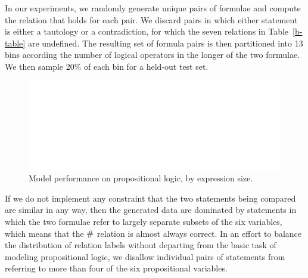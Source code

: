 In our experiments, we randomly generate unique pairs 
of formulae and compute the relation that holds for each pair.
We discard pairs in which either statement is either a tautology or a
contradiction, for which the seven relations in
Table~\ref{b-table} are undefined. The resulting set of formula pairs is
then partitioned into 13 bins according the number of logical operators in
the longer of the two formulae. We then sample 20\% of each
bin for a held-out test set.

\begin{figure}[t]
  \centering
  \includegraphics[width=5.75in]{decayfig.eps}
  \caption{Model performance on propositional logic, by expression size.}
    
  \label{prop-results} 
  
\end{figure}

If we do not implement any constraint that the two statements being
compared are similar in any way, then the generated data are dominated
by statements in which the two formulae refer to largely separate
subsets of the six variables, which means that the $\mathbin{\#}$ relation
is almost always correct.  In an effort to balance the distribution of
relation labels without departing from the basic task of modeling
propositional logic, we disallow individual pairs of statements from
referring to more than four of the six propositional variables.

